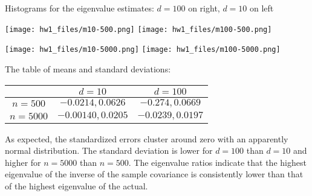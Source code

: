 \documentclass{article}
\begin{document}
Histograms for the eigenvalue estimates: $d=100$ on right, $d=10$ on left

\texttt{[image: hw1\_files/m10-500.png]}
\texttt{[image: hw1\_files/m100-500.png]}

\texttt{[image: hw1\_files/m10-5000.png]}
\texttt{[image: hw1\_files/m100-5000.png]}

The table of means and standard deviations:

\begin{tabular}{c|c|c}
    &$d=10$&$d=100$\\
    \hline
    $n=500$&$-0.0214,0.0626$&$-0.274,0.0669$\\
    \hline
    $n=5000$&$-0.00140,0.0205$&$-0.0239,0.0197$\\
\end{tabular}

As expected, the standardized errors cluster around zero with an apparently normal distribution. The standard deviation is lower for $d=100$ than $d=10$ and higher for $n=5000$ than $n=500$. The eigenvalue ratios indicate that the highest eigenvalue of the inverse of the sample covariance is consistently lower than that of the highest eigenvalue of the actual.
\end{document}
